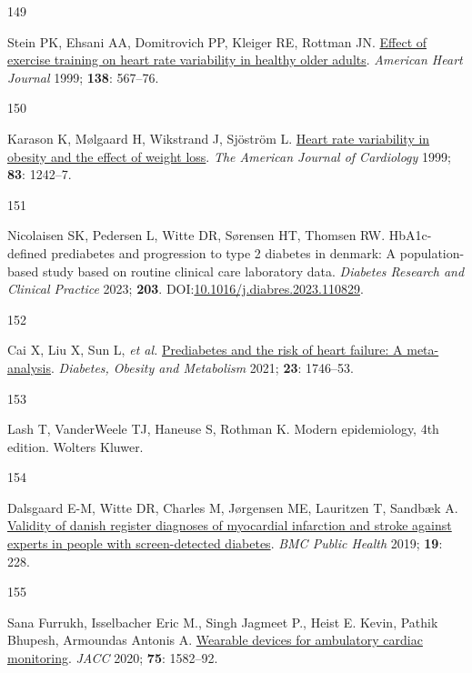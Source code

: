 \documentclass[
  a4paper,
  headsepline=true,
  open=left]{scrbook}
\newlength{\cslhangindent}
\newlength{\csllabelwidth}
\newlength{\cslentryspacingunit} %
\newenvironment{CSLReferences}[2] %
 {%
  \setlength{\parindent}{0pt}
  \ifodd #1
  \let\oldpar\par
  \def\par{\hangindent=\cslhangindent\oldpar}
  \fi
  \setlength{\parskip}{#2\cslentryspacingunit}
 }%
 {}
\newcommand{\CSLLeftMargin}[1]{\parbox[t]{\csllabelwidth}{#1}}
\newcommand{\CSLRightInline}[1]{\parbox[t]{\linewidth - \csllabelwidth}{#1}\break}
\begin{document}
\begin{CSLReferences}{0}{0}
\leavevmode{}%
\CSLLeftMargin{149 }%
\CSLRightInline{Stein PK, Ehsani AA, Domitrovich PP, Kleiger RE, Rottman
JN. \href{https://doi.org/10.1016/S0002-8703(99)70162-6}{Effect of
exercise training on heart rate variability in healthy older adults}.
\emph{American Heart Journal} 1999; \textbf{138}: 567--76.}

\leavevmode{}%
\CSLLeftMargin{150 }%
\CSLRightInline{Karason K, Mølgaard H, Wikstrand J, Sjöström L.
\href{https://doi.org/10.1016/S0002-9149(99)00066-1}{Heart rate
variability in obesity and the effect of weight loss}. \emph{The
American Journal of Cardiology} 1999; \textbf{83}: 1242--7.}

\leavevmode{}%
\CSLLeftMargin{151 }%
\CSLRightInline{Nicolaisen SK, Pedersen L, Witte DR, Sørensen HT,
Thomsen RW. HbA1c-defined prediabetes and progression to type 2 diabetes
in denmark: A population-based study based on routine clinical care
laboratory data. \emph{Diabetes Research and Clinical Practice} 2023;
\textbf{203}.
DOI:\href{https://doi.org/10.1016/j.diabres.2023.110829}{10.1016/j.diabres.2023.110829}.}

\leavevmode{}%
\CSLLeftMargin{152 }%
\CSLRightInline{Cai X, Liu X, Sun L, \emph{et al.}
\href{https://doi.org/10.1111/dom.14388}{Prediabetes and the risk of
heart failure: A meta-analysis}. \emph{Diabetes, Obesity and Metabolism}
2021; \textbf{23}: 1746--53.}

\leavevmode{}%
\CSLLeftMargin{153 }%
\CSLRightInline{Lash T, VanderWeele TJ, Haneuse S, Rothman K. Modern
epidemiology, 4th edition. Wolters Kluwer.}

\leavevmode{}%
\CSLLeftMargin{154 }%
\CSLRightInline{Dalsgaard E-M, Witte DR, Charles M, Jørgensen ME,
Lauritzen T, Sandbæk A.
\href{https://doi.org/10.1186/s12889-019-6549-z}{Validity of danish
register diagnoses of myocardial infarction and stroke against experts
in people with screen-detected diabetes}. \emph{BMC Public Health} 2019;
\textbf{19}: 228.}

\leavevmode{}%
\CSLLeftMargin{155 }%
\CSLRightInline{Sana Furrukh, Isselbacher Eric M., Singh Jagmeet P.,
Heist E. Kevin, Pathik Bhupesh, Armoundas Antonis A.
\href{https://doi.org/10.1016/j.jacc.2020.01.046}{Wearable devices for
ambulatory cardiac monitoring}. \emph{JACC} 2020; \textbf{75}:
1582--92.}


\end{CSLReferences}
\end{document}

